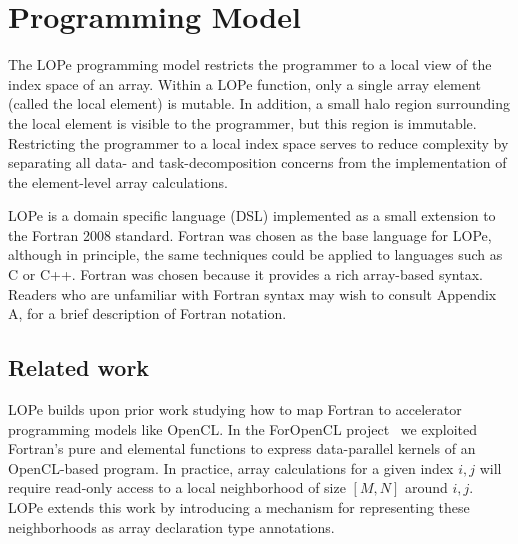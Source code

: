 \section{Programming Model}

The LOPe programming model
restricts the programmer to a local view of the index
space of an array.  Within a LOPe function, only a single array
element (called the local element) is mutable.  In addition, a small
halo region surrounding the local element is visible to the
programmer, but this region is immutable.  Restricting the programmer
to a local index space serves to reduce complexity by separating all
data- and task-decomposition concerns from the implementation of the
element-level array calculations.


LOPe is a domain specific language (DSL) implemented as a small extension
to the Fortran 2008 standard.
Fortran was chosen as the base language for LOPe, although in
principle, the same techniques could be applied to languages such as C
or C++.  Fortran was chosen because it provides a
rich array-based syntax.  Readers who are unfamiliar with Fortran
syntax may wish to consult Appendix A, for a brief description of
Fortran notation.

\subsection{Related work}

LOPe builds upon prior work studying how to map Fortran to accelerator
programming models like OpenCL.  In the ForOpenCL project~\cite{Sottile:2013:FTE:2441516.2441520}
we exploited Fortran's pure and elemental functions to express
data-parallel kernels of an OpenCL-based program.  In practice, array
calculations for a given index $i,j$ will require read-only access to
a local neighborhood of size $[M,N]$ around $i,j$.  LOPe extends this work by introducing
a mechanism for representing these neighborhoods as array declaration
type annotations.


